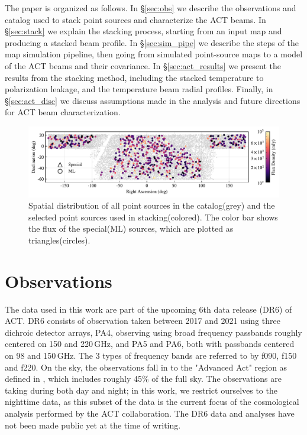 The paper is organized as follows. 
In \S\ref{sec:obs} we describe the observations and catalog used to stack point sources and characterize the ACT beams.  In \S\ref{sec:stack} we explain the stacking process, starting from an input map and producing a stacked beam profile.  In \S\ref{sec:sim_pipe} we describe the steps of the map simulation pipeline, then going from simulated point-source maps to a model of the ACT beams and their covariance.  In \S\ref{sec:act_results} we present the results from the stacking method, including the stacked temperature to polarization leakage, and the temperature beam radial profiles.  Finally, in \S\ref{sec:act_disc} we discuss assumptions made in the analysis and future directions for ACT beam characterization.

\begin{figure}[t]
    \centering
    \includegraphics[width = \textwidth]{Figures/flux_map.pdf}
    \caption{Spatial distribution of all point sources in the catalog(grey) and the selected point sources used in stacking(colored).  The color bar shows the flux of the special(ML) sources, which are plotted as triangles(circles).}
    \label{fig:ptsrc_map}
\end{figure}

\section{Observations}
\label{sec:observations}

The  data used in this work are part of the upcoming 6th data release (DR6) of ACT. DR6 consists of observation taken between 2017 and 2021 using three dichroic detector arrays, PA4, observing using broad frequency passbands roughly centered on  150 and 220\,GHz, and PA5 and PA6, both with passbands centered on 98 and 150\,GHz. The 3 types of frequency bands are referred to by f090, f150 and f220. On the sky, the observations fall in to the "Advanced Act" region as defined in \cite{aiola_2020}, which includes roughly 45\% of the full sky. The observations are taking during both day and night; in this work, we restrict ourselves to the nighttime data, as this subset of the data is the current focus of the cosmological analysis performed by the ACT collaboration. The DR6 data and analyses have not been made public yet at the time of writing.

